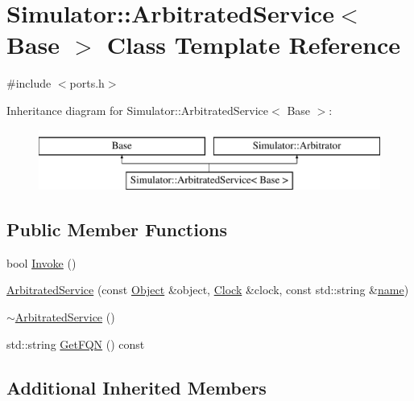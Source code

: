 \hypertarget{class_simulator_1_1_arbitrated_service}{\section{Simulator\+:\+:Arbitrated\+Service$<$ Base $>$ Class Template Reference}
\label{class_simulator_1_1_arbitrated_service}
}


{\ttfamily \#include $<$ports.\+h$>$}

Inheritance diagram for Simulator\+:\+:Arbitrated\+Service$<$ Base $>$\+:\begin{figure}[H]
\begin{center}
\leavevmode
\includegraphics[height=2.000000cm]{class_simulator_1_1_arbitrated_service}
\end{center}
\end{figure}
\subsection*{Public Member Functions}
\begin{DoxyCompactItemize}
\item 
bool \hyperlink{class_simulator_1_1_arbitrated_service_afa7be6cfa4c0ef3591b63e46eb35912b}{Invoke} ()
\item 
\hyperlink{class_simulator_1_1_arbitrated_service_ac238e575cd81ad43cb8ce6a8c65806ee}{Arbitrated\+Service} (const \hyperlink{class_simulator_1_1_object}{Object} \&object, \hyperlink{class_simulator_1_1_clock}{Clock} \&clock, const std\+::string \&\hyperlink{mtconf_8c_a8f8f80d37794cde9472343e4487ba3eb}{name})
\item 
\hyperlink{class_simulator_1_1_arbitrated_service_abff05e45835efad7912524efd7dcd26e}{$\sim$\+Arbitrated\+Service} ()
\item 
std\+::string \hyperlink{class_simulator_1_1_arbitrated_service_a3800ca938165d86a3f5b11a2dae763d7}{Get\+F\+Q\+N} () const 
\end{DoxyCompactItemize}
\subsection*{Additional Inherited Members}


